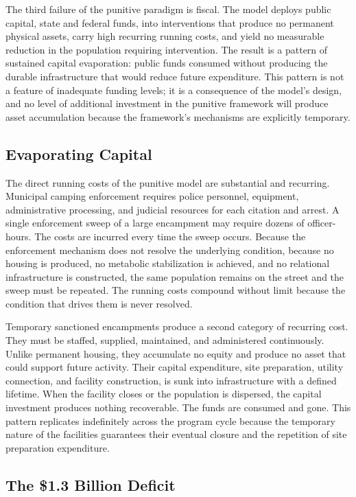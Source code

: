 \documentclass[12pt, letterpaper]{article}
\begin{document}
The third failure of the punitive paradigm is fiscal. The model deploys public capital, state and federal funds, into interventions that produce no permanent physical assets, carry high recurring running costs, and yield no measurable reduction in the population requiring intervention. The result is a pattern of sustained capital evaporation: public funds consumed without producing the durable infrastructure that would reduce future expenditure. This pattern is not a feature of inadequate funding levels; it is a consequence of the model's design, and no level of additional investment in the punitive framework will produce asset accumulation because the framework's mechanisms are explicitly temporary.

\subsection{Evaporating Capital}

The direct running costs of the punitive model are substantial and recurring. Municipal camping enforcement requires police personnel, equipment, administrative processing, and judicial resources for each citation and arrest. A single enforcement sweep of a large encampment may require dozens of officer-hours. The costs are incurred every time the sweep occurs. Because the enforcement mechanism does not resolve the underlying condition, because no housing is produced, no metabolic stabilization is achieved, and no relational infrastructure is constructed, the same population remains on the street and the sweep must be repeated. The running costs compound without limit because the condition that drives them is never resolved.

Temporary sanctioned encampments produce a second category of recurring cost. They must be staffed, supplied, maintained, and administered continuously. Unlike permanent housing, they accumulate no equity and produce no asset that could support future activity. Their capital expenditure, site preparation, utility connection, and facility construction, is sunk into infrastructure with a defined lifetime. When the facility closes or the population is dispersed, the capital investment produces nothing recoverable. The funds are consumed and gone. This pattern replicates indefinitely across the program cycle because the temporary nature of the facilities guarantees their eventual closure and the repetition of site preparation expenditure.

\subsection{The \$1.3 Billion Deficit}
\end{document}
